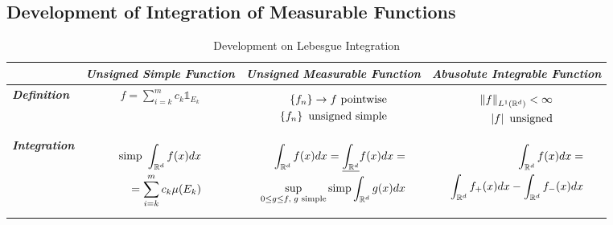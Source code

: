 \documentclass[11pt]{article}
\begin{document}
\subsection{Development of Integration of Measurable Functions}
\begin{table}[h!]
\setlength{\abovedisplayskip}{0pt}
\setlength{\belowdisplayskip}{-10pt}
\setlength{\abovedisplayshortskip}{0pt}
\setlength{\belowdisplayshortskip}{0pt}
\footnotesize
\centering
\caption{Development on Lebesgue Integration}
\label{tab: integration}
\renewcommand\tabularxcolumn[1]{m{#1}}
\small
\begin{tabularx}{1\textwidth} { 
  | >{\raggedright\arraybackslash} m{3cm}
  | >{\centering\arraybackslash}X
  | >{\centering\arraybackslash}X
  | >{\centering\arraybackslash}X  | }
 \hline
  &  \emph{\textbf{Unsigned Simple Function}} & \emph{\textbf{Unsigned Measurable Function}}   &  \emph{\textbf{Abusolute Integrable Function}}   \\
  \hline 
\textbf{\emph{Definition}}    &
\begin{align*}
f = \sum_{i=k}^{m}c_k \mathds{1}_{E_k}
\end{align*}
 & 
 \begin{align*}
\left\{f_n\right\} \rightarrow f \text{ pointwise}\\
\left\{f_n\right\} \text{ unsigned simple}
\end{align*}
 & 
\begin{align*}
\left\|f\right\|_{L^1({\mathbb R}^d)} < \infty\\
\left\lvert f \right\rvert \text{ unsigned}
\end{align*}
\\
 \hline \vspace{5pt}
\emph{\textbf{Integration}}  \vspace{2pt} &  
\begin{align*}
\text{simp }\int_{{\mathbb R}^d} f(x) dx \\
= \sum_{i=k}^{m}c_k \mu(E_k)
\end{align*}
 &
 \begin{align*}
\int_{{\mathbb R}^{d}}f(x)dx =  \underline{\int_{{\mathbb R}^{d}}}f(x)dx =\\
  \sup\limits_{0\le g\le f,\; g\text{ simple}} \text{simp}\int_{{\mathbb R}^{d}}g(x) dx
 \end{align*}
  & \begin{align*}
\int_{{\mathbb R}^{d}}f(x)dx =\\
 \int_{{\mathbb R}^{d}}f_{+}(x)dx - \int_{{\mathbb R}^{d}}f_{-}(x)dx
\end{align*}  \\

\end{tabularx}
\end{table}
\end{document}
